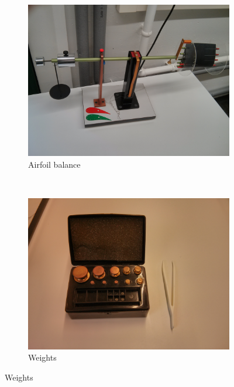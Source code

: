\documentclass{scrreprt}
\begin{document}
\begin{figure}[H]
        \centering
        \begin{subfigure}[b]{0.45\textwidth}
                \centering
                \includegraphics[width=\textwidth]{img/balance.jpg}
                \caption{Airfoil balance}
                \label{fig:balance}
        \end{subfigure}%
        ~
        \begin{subfigure}[b]{0.45\textwidth}
                \centering
                \includegraphics[width=\textwidth]{img/weights.jpg}
                \caption{Weights}
                \label{fig:weights}
        \end{subfigure}
          

\end{figure}
\end{document}
